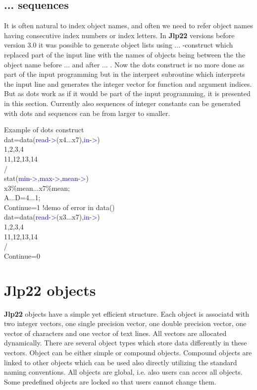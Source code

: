 \subsection{...  sequences}
\label{dots}
It is often natural to index object names, and often we need to refer object
names having consecutive index numbers or index letters. In \textbf{Jlp22} versions before version 3.0 it
was possible to generate object lists using ... -construct which replaced part of
the input line with the names of objects being between the the object
name before ... and after ... . Now the dots construct is no more done as
part of the input programming but in the interpret subroutine which interprets the
input line and generates the integer vector for function and argument indices.
But as dots work as if it would be part of the input programming, it is presented in this
section. Currently also sequences of integer constants can be generated with dots and
sequences can be from larger to smaller.
\begin{example}[dotsex]Example of dots construct\\
\label{dotsex}
dat=\textcolor{VioletRed}{data}(\textcolor{blue}{read->}(x4...x7),\textcolor{blue}{in->})\\
1,2,3,4\\
11,12,13,14\\
/\\
\textcolor{VioletRed}{stat}(\textcolor{blue}{min->},\textcolor{blue}{max->},\textcolor{blue}{mean->})\\
x3\%mean...x7\%mean;\\
A...D=4...1;\\
Continue=1  !demo of error in \textcolor{VioletRed}{data}()\\
dat=\textcolor{VioletRed}{data}(\textcolor{blue}{read->}(x3...x7),\textcolor{blue}{in->})\\
1,2,3,4\\
11,12,13,14\\
/\\
Continue=0
\end{example}

\section{\textbf{Jlp22} objects}
\label{objintro}
\textbf{Jlp22} objects have a simple yet efficient structure. Each object is associatd with two integer vectors, one single precision vector, one double precision vector,
one vector of characters and one vector of text lines. All vectors are allocated dynamically.
There are several object types which store data differently in these vectors.
Object can be either simple or compound objects. Compound objects are linked to other
objects which can be used also directly utilizing the standard naming conventions. All objects are
global, i.e. also users can acces all objects. Some predefined objects are locked so that
users cannot change them.


